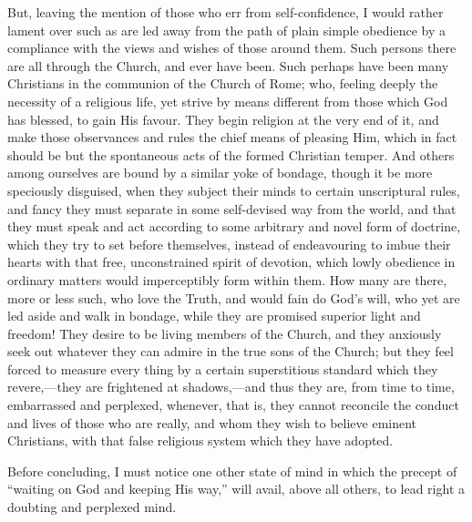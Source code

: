 But, leaving the mention of those who err from
self-confidence, I would rather lament over such as are
led away from the path of plain simple obedience by a
compliance with the views and wishes of those around
them. Such persons there are all through the Church, and
ever have been. Such perhaps have been many Christians in
the communion of the Church of Rome; who, feeling deeply
the necessity of a religious life, yet strive by means
different from those which God has blessed, to gain His
favour. They begin religion at the very end of it, and
make those observances and rules the chief means of
pleasing Him, which in fact should be but the spontaneous
acts of the formed Christian temper. And others among
ourselves are bound by a similar yoke of bondage, though
it be more speciously disguised, when they subject their
minds to certain unscriptural rules, and fancy they must
separate in some self-devised way from the world, and
that they must speak and act according to some arbitrary
and novel form of doctrine, which they try to set before
themselves, instead of endeavouring to imbue their hearts
with that free, unconstrained spirit of devotion, which
lowly obedience in ordinary matters would imperceptibly
form within them. How many are there, more or less such,
who love the Truth, and would fain do God's will, who yet
are led aside and walk in bondage, while they are
promised superior light and freedom! They desire to be
living members of the Church, and they anxiously seek out
whatever they can admire in the true sons of the Church;
but they feel forced to measure every thing by a certain
superstitious standard which they revere,—they are
frightened at shadows,—and thus they are, from time
to time, embarrassed and perplexed, whenever, that is,
they cannot reconcile the conduct and lives of those who
are really, and whom they wish to believe eminent
Christians, with that false religious system which they
have adopted.

Before concluding, I must notice one other state of
mind in which the precept of ``waiting on God and
keeping His way,'' will avail, above all others, to
lead right a doubting and perplexed mind.

